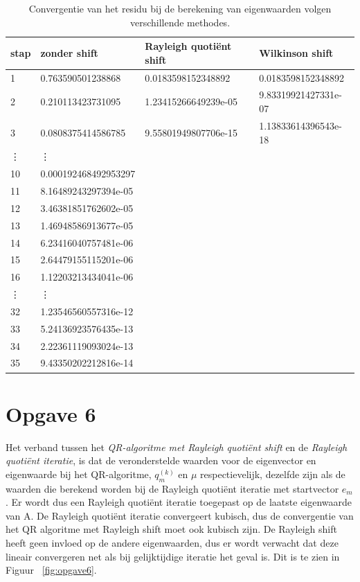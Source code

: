 \documentclass[a4paper]{article}
\newcommand{\opgave}[1]{\section*{Opgave #1}}
\begin{document}
\begin{table}[h]
\begin{tabular}{|l|l|l|l|}
\hline
stap & zonder shift & Rayleigh quoti\"{e}nt shift & Wilkinson shift \\
\hline
1 & 0.763590501238868 & 0.0183598152348892 & 0.0183598152348892 \\
2 & 0.210113423731095 & 1.23415266649239e-05 & 9.83319921427331e-07 \\
3 & 0.0808375414586785 & 9.55801949807706e-15 & 1.13833614396543e-18 \\
\vdots & \vdots &  &  \\
10 & 0.000192468492953297 &  &  \\
11 & 8.16489243297394e-05 &  &  \\
12 & 3.46381851762602e-05 &  &  \\
13 & 1.46948586913677e-05 &  &  \\
14 & 6.23416040757481e-06 &  &  \\
15 & 2.64479155115201e-06 &  &  \\
16 & 1.12203213434041e-06 &  &  \\
\vdots & \vdots &  &  \\
32 & 1.23546560557316e-12 &  &  \\
33 & 5.24136923576435e-13 &  &  \\
34 & 2.22361119093024e-13 &  &  \\
35 & 9.43350202212816e-14 &  &  \\
\hline
\end{tabular}
\caption{Convergentie van het residu bij de berekening van eigenwaarden volgen verschillende methodes.}
\label{table:tab2}
\end{table}
\opgave{6}
Het verband tussen het \textit{QR-algoritme met Rayleigh quoti\"{e}nt shift} en de \textit{Rayleigh quoti\"{e}nt iteratie}, is dat de veronderstelde waarden voor de eigenvector
en eigenwaarde bij het QR-algoritme, $q_m^{(k)}$ en $\mu$ respectievelijk, dezelfde zijn als de waarden
die berekend worden bij de Rayleigh quoti\"{e}nt iteratie met startvector $e_m$. Er wordt dus een Rayleigh quoti\"{e}nt iteratie toegepast op de laatste eigenwaarde van
A. De Rayleigh quoti\"{e}nt iteratie convergeert kubisch, dus de convergentie van het QR algoritme met Rayleigh shift moet ook kubisch zijn. De Rayleigh shift heeft geen invloed op de andere eigenwaarden, dus er wordt verwacht dat deze lineair convergeren net als bij gelijktijdige iteratie het geval is. Dit is te zien in Figuur ~\ref{fig:opgave6}.
\end{document}
